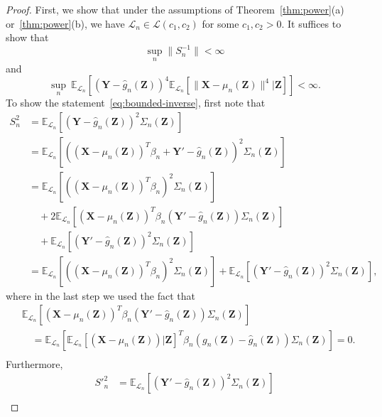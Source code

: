 \documentclass[12pt]{article}
\theoremstyle{definition}
\theoremstyle{remark}
\newcommand{\prx}{\bm X}
\newcommand{\prz}{\bm Z}
\newcommand{\pry}{{\bm Y}}
\begin{document}
\begin{proof}
First, we show that under the assumptions of Theorem~\ref{thm:power}(a) or~\ref{thm:power}(b), we have $\mathcal L_n \in \mathscr L(c_1, c_2)$ for some $c_1, c_2 > 0$. It suffices to show that
\begin{equation}
\sup_{n} \|S_n^{-1}\| < \infty
\label{eq:bounded-inverse}
\end{equation}
and
\begin{equation}
\sup_n\ \mathbb E_{\mathcal L_n}\left[(\pry - \widehat g_n(\prz))^{4} \mathbb E_{\mathcal L_n}[\|\prx - \mu_n(\prz)\|^{4}|\prz]\right] < \infty.
\label{eq:bounded-eighth-moment}
\end{equation}
To show the statement~\eqref{eq:bounded-inverse}, first note that
\begin{equation}
	\begin{split}
		S_n^2 &= \mathbb E_{\mathcal L_n}[(\pry - \widehat g_n(\prz))^2 \Sigma_n(\prz)] \\
		&=   \mathbb E_{\mathcal L_n}[((\prx - \mu_n(\prz))^T \beta_n + \pry'-\widehat g_n(\prz))^2 \Sigma_n(\prz)] \\
		&= \mathbb E_{\mathcal L_n}[((\prx - \mu_n(\prz))^T \beta_n)^2\Sigma_n(\prz)]  \\
		&\quad+2\mathbb E_{\mathcal L_n}[(\prx - \mu_n(\prz))^T \beta_n( \pry'-\widehat g_n(\prz))\Sigma_n(\prz)] \\
		&\quad + \mathbb E_{\mathcal L_n}[( \pry'-\widehat g_n(\prz))^2 \Sigma_n(\prz)] \\
		&= \mathbb E_{\mathcal L_n}[((\prx - \mu_n(\prz))^T \beta_n)^2\Sigma_n(\prz)] + \mathbb E_{\mathcal L_n}[(\pry'-\widehat g_n(\prz))^2 \Sigma_n(\prz)],
		\label{eq:s-n-2}
	\end{split}
\end{equation}
where in the last step we used the fact that
\begin{equation*}
	\begin{split}
		&\mathbb E_{\mathcal L_n}[(\prx - \mu_n(\prz))^T \beta_n( \pry'-\widehat g_n(\prz))\Sigma_n(\prz)] \\
		&\quad=\mathbb E_{\mathcal L_n}[\mathbb E_{\mathcal L_n}[(\prx - \mu_n(\prz))|\prz]^T \beta_n( g_n(\prz)-\widehat g_n(\prz))\Sigma_n(\prz)] = 0. \\
	\end{split}
\end{equation*}
Furthermore, 
\begin{equation}
	\begin{split}
		S'^2_n &= \mathbb E_{\mathcal L_n}[(\pry'-\widehat g_n(\prz))^2 \Sigma_n(\prz)] \\

\end{split}
\end{equation}
\end{proof}
\end{document}
